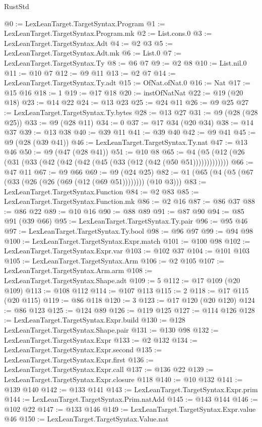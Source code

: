 \begin{lexlean}{RustStd}
\begin{coremodule}
@0 := LexLeanTarget.TargetSyntax.Program
@1 := LexLeanTarget.TargetSyntax.Program.mk
@2 := List.cons.{0}
@3 := LexLeanTarget.TargetSyntax.Adt
@4 := @2 @3
@5 := LexLeanTarget.TargetSyntax.Adt.mk
@6 := List.{0}
@7 := LexLeanTarget.TargetSyntax.Ty
@8 := @6 @7
@9 := @2 @8
@10 := List.nil.{0}
@11 := @10 @7
@12 := @9 @11
@13 := @2 @7
@14 := LexLeanTarget.TargetSyntax.Ty.adt
@15 := OfNat.ofNat.{0}
@16 := Nat
@17 := @15 @16
@18 := 1
@19 := @17 @18
@20 := instOfNatNat
@22 := @19 (@20 @18)
@23 := @14 @22
@24 := @13 @23
@25 := @24 @11
@26 := @9 @25
@27 := LexLeanTarget.TargetSyntax.Ty.bytes
@28 := @13 @27
@31 := @9 (@28 (@28 @25))
@33 := @9 (@28 @11)
@34 := 0
@37 := @17 @34 (@20 @34)
@38 := @14 @37
@39 := @13 @38
@40 := @39 @11
@41 := @39 @40
@42 := @9 @41
@45 := @9 (@28 (@39 @41))
@46 := LexLeanTarget.TargetSyntax.Ty.nat
@47 := @13 @46
@50 := @9 (@47 (@28 @41))
@51 := @10 @8
@65 := @4 (@5 (@12 (@26 (@31 (@33 (@42 (@42 (@42 (@45 (@33 (@12 (@42 (@50 @51)))))))))))))
@66 := @47 @11
@67 := @9 @66
@69 := @9 (@24 @25)
@82 := @1 (@65 (@4 (@5 (@67 (@33 (@26 (@26 (@69 (@12 (@69 @51)))))))) (@10 @3)))
@83 := LexLeanTarget.TargetSyntax.Function
@84 := @2 @83
@85 := LexLeanTarget.TargetSyntax.Function.mk
@86 := @2 @16
@87 := @86 @37
@88 := @86 @22
@89 := @10 @16
@90 := @88 @89
@91 := @87 @90
@94 := @85 @91 (@39 @66)
@95 := LexLeanTarget.TargetSyntax.Ty.pair
@96 := @95 @46
@97 := LexLeanTarget.TargetSyntax.Ty.bool
@98 := @96 @97
@99 := @94 @98
@100 := LexLeanTarget.TargetSyntax.Expr.match
@101 := @100 @98
@102 := LexLeanTarget.TargetSyntax.Expr.var
@103 := @102 @37
@104 := @101 @103
@105 := LexLeanTarget.TargetSyntax.Arm
@106 := @2 @105
@107 := LexLeanTarget.TargetSyntax.Arm.arm
@108 := LexLeanTarget.TargetSyntax.Shape.adt
@109 := 5
@112 := @17 @109 (@20 @109)
@113 := @108 @112
@114 := @107 @113
@115 := 2
@118 := @17 @115 (@20 @115)
@119 := @86 @118
@120 := 3
@123 := @17 @120 (@20 @120)
@124 := @86 @123
@125 := @124 @89
@126 := @119 @125
@127 := @114 @126
@128 := LexLeanTarget.TargetSyntax.Expr.build
@130 := @128 LexLeanTarget.TargetSyntax.Shape.pair
@131 := @130 @98
@132 := LexLeanTarget.TargetSyntax.Expr
@133 := @2 @132
@134 := LexLeanTarget.TargetSyntax.Expr.second
@135 := LexLeanTarget.TargetSyntax.Expr.first
@136 := LexLeanTarget.TargetSyntax.Expr.call
@137 := @136 @22
@139 := LexLeanTarget.TargetSyntax.Expr.closure @118
@140 := @10 @132
@141 := @139 @140
@142 := @133 @141
@143 := LexLeanTarget.TargetSyntax.Expr.prim
@144 := LexLeanTarget.TargetSyntax.Prim.natAdd
@145 := @143 @144
@146 := @102 @22
@147 := @133 @146
@149 := LexLeanTarget.TargetSyntax.Expr.value @46
@150 := LexLeanTarget.TargetSyntax.Value.nat

\end{coremodule}
\end{lexlean}
